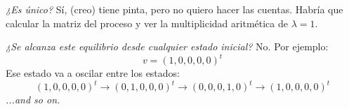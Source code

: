 \begin{enumerate}[label=\alph*)]
        \bigskip

        \textit{¿Es único?} Sí, {\tiny (creo)} tiene pinta, pero no quiero hacer las cuentas.
        Habría que calcular la matriz del proceso y ver la multiplicidad aritmética de $\lambda = 1$.

        \bigskip

        \textit{¿Se alcanza este equilibrio desde cualquier estado inicial?} No. Por ejemplo:
        $$
          v = (1, 0, 0, 0, 0)^t
        $$
        Ese estado va a oscilar entre los estados:
        $$
          (1, 0, 0, 0, 0)^t
          \to
          (0, 1, 0, 0, 0)^t
          \to
          (0, 0, 0, 1, 0)^t
          \to
          (1, 0, 0, 0, 0)^t
        $$
        \textit{...and so on.}

\end{enumerate}

\begin{aportes}
  \item {}
\end{aportes}

